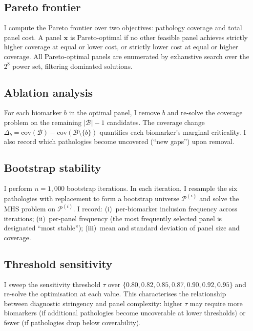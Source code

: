 \documentclass[times, twoside, watermark]{zHenriquesLab-StyleBioRxiv}
\begin{document}
\subsection*{Pareto frontier}

I compute the Pareto frontier over two objectives: pathology coverage and total panel cost. A panel $\mathbf{x}$ is Pareto-optimal if no other feasible panel achieves strictly higher coverage at equal or lower cost, or strictly lower cost at equal or higher coverage. All Pareto-optimal panels are enumerated by exhaustive search over the $2^8$ power set, filtering dominated solutions.

\subsection*{Ablation analysis}

For each biomarker $b$ in the optimal panel, I remove $b$ and re-solve the coverage problem on the remaining $|\mathcal{B}| - 1$ candidates. The coverage change $\Delta_b = \text{cov}(\mathcal{B}) - \text{cov}(\mathcal{B} \setminus \{b\})$ quantifies each biomarker's marginal criticality. I also record which pathologies become uncovered (``new gaps'') upon removal.

\subsection*{Bootstrap stability}

I perform $n = 1{,}000$ bootstrap iterations. In each iteration, I resample the six pathologies with replacement to form a bootstrap universe $\mathcal{P}^{(i)}$ and solve the MHS problem on $\mathcal{P}^{(i)}$. I record: (i)~per-biomarker inclusion frequency across iterations; (ii)~per-panel frequency (the most frequently selected panel is designated ``most stable''); (iii)~mean and standard deviation of panel size and coverage.

\subsection*{Threshold sensitivity}

I sweep the sensitivity threshold $\tau$ over $\{0.80, 0.82, 0.85, 0.87, 0.90, 0.92, 0.95\}$ and re-solve the optimisation at each value. This characterises the relationship between diagnostic stringency and panel complexity: higher $\tau$ may require more biomarkers (if additional pathologies become uncoverable at lower thresholds) or fewer (if pathologies drop below coverability).
\end{document}
